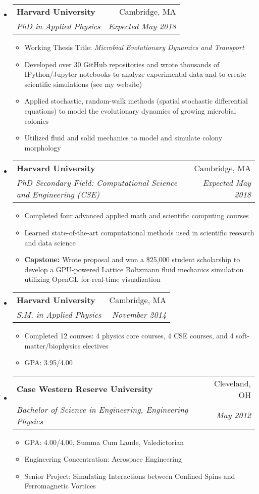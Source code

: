 \documentclass[letterpaper,11pt]{article}
\makeatletter
\newcommand{\resitem}[1]{\item #1 \vspace{-2pt}}
\newcommand{\ressubheading}[4]{\vspace{-14pt}
\begin{tabular*}{7.0in}{l@{\extracolsep{\fill}}r}
                \\
                \textbf{#1} & #2 \\
                \textit{#3} & \textit{#4} \\
\end{tabular*}\vspace{-6pt}}
\makeatother
\begin{document}
\begin{itemize}
\item \ressubheading{Harvard University}{Cambridge, MA}{PhD in Applied Physics}{Expected May 2018}     
\begin{itemize}
\resitem{Working Thesis Title: \textit{Microbial Evolutionary Dynamics and Transport}}
\resitem{Developed over 30 GitHub repositories and wrote thousands of IPython/Jupyter notebooks to analyze experimental data and to create scientific simulations (see my website)}
\resitem{Applied stochastic, random-walk methods (spatial stochastic differential equations) to model the evolutionary dynamics of growing microbial colonies}
\resitem{Utilized fluid and solid mechanics to model and simulate colony morphology}

\end{itemize}


\item \ressubheading{Harvard University}{Cambridge, MA}{PhD Secondary Field: Computational Science and Engineering (CSE)}{Expected May 2018}
\begin{itemize}                   
\resitem{Completed four advanced applied math and scientific computing courses}
\resitem{Learned state-of-the-art computational methods used in scientific research and data science}
\resitem{\textbf{Capstone:} Wrote proposal and won a \$25,000 student scholarship to develop a GPU-powered Lattice Boltzmann fluid mechanics simulation utilizing OpenGL for real-time visualization}
\end{itemize}     
              
\item \ressubheading{Harvard University}{Cambridge, MA}{S.M. in Applied Physics}{November 2014}
        \begin{itemize}
        \resitem{Completed 12 courses: 4 physics core courses, 4 CSE courses, and 4 soft-matter/biophysics electives}
        \resitem{GPA: 3.95/4.00}
        \end{itemize}
\item
        \ressubheading{Case Western Reserve University}{Cleveland, OH}{Bachelor of Science in Engineering, Engineering Physics}{May 2012}
        \begin{itemize}
                \resitem{GPA: 4.00/4.00, Summa Cum Laude, Valedictorian }
                \resitem{Engineering Concentration: Aerospace Engineering}
                \resitem{Senior Project: Simulating Interactions between Confined Spins and Ferromagnetic Vortices}
        \end{itemize}
\end{itemize}
\end{document}
